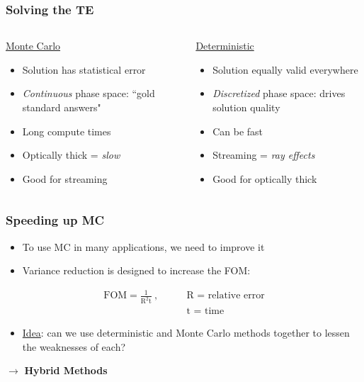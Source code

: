 \documentclass[xcolor=x11names,compress]{beamer}
\renewcommand{\(}{\begin{columns}}
\renewcommand{\)}{\end{columns}}
\newcommand{\<}[1]{\begin{column}{#1}}
\renewcommand{\>}{\end{column}}
\begin{document}
\begin{frame}[fragile]
  \frametitle{Solving the TE}
%
\begin{columns}
  \begin{column}{0.5\textwidth}
  \begin{center}
  \underline{Monte Carlo}
  \end{center}
	\begin{itemize}
	\item Solution has statistical error
	\item \textit{Continuous} phase space: ``gold standard answers"
	\item Long compute times
	\item Optically thick = \textit{slow}
	\item Good for streaming
	\end{itemize}
  \end{column}
  \begin{column}{0.5\textwidth}
  \begin{center}
  \underline{Deterministic}
  \end{center}
	\begin{itemize}
	\item Solution equally valid everywhere
	\item \textit{Discretized} phase space: drives solution quality
	\item Can be fast
	\item Streaming = \textit{ray effects}
	\item Good for optically thick
	\end{itemize}
  \end{column}
\end{columns}

\end{frame}


\begin{frame}[fragile]
  \frametitle{Speeding up MC}
  \begin{itemize}
  	\item To use MC in many applications, we need to \alert{improve} it
	\item Variance reduction is designed to increase the FOM:
  \end{itemize}
\begin{align}
\text{FOM} = \frac{1}{\text{R}^2\text{t}}\:,
 \qquad & \text{R = relative error} \nonumber \\ 
& \text{t = time} \nonumber 
\end{align}
  \begin{itemize}
  \pause
  	\item \underline{Idea}: can we use deterministic and Monte Carlo methods together to lessen the weaknesses of each?
  \end{itemize}
  \pause
  $\rightarrow$ \textbf{Hybrid Methods}

\end{frame}
\end{document}
